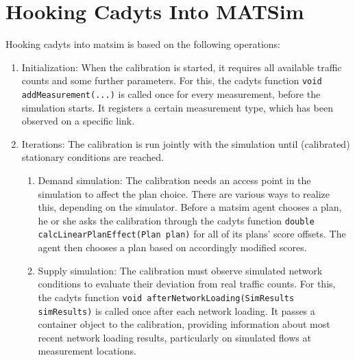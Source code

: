 \section{Hooking Cadyts Into MATSim}
Hooking \gls{cadyts} into \gls{matsim} is based on the following operations:
\begin{enumerate}\styleEnumerate
\item Initialization: When the calibration is started, it requires all available 
traffic counts and some further parameters. 
For this, the \gls{cadyts} function \lstinline|void addMeasurement(...)| is called once for every 
measurement, before the simulation starts. It registers a certain measurement type, which 
has been observed on a specific link.
\item Iterations: The calibration is run jointly with the simulation until (calibrated) 
stationary conditions are reached.
	\begin{enumerate}[label=\emph{\alph*})]
	\item Demand simulation: The calibration needs an access point in the simulation 
	to affect the plan choice. There are various ways to realize this, depending on the  
	simulator.	
	Before a \gls{matsim} agent chooses a plan, he or she asks the calibration through the 
	\gls{cadyts} function
	\lstinline|double calcLinearPlanEffect(Plan plan)| for all of its plans' score offsets.
    The agent then chooses a plan based on accordingly modified scores.
	\item Supply simulation: The calibration must observe simulated network conditions 
  to evaluate their deviation from real traffic counts.
	For this, the \gls{cadyts} function \lstinline|void afterNetworkLoading(SimResults simResults)| 
	is called once after each network loading. It passes a container object to the calibration, 
	providing information about most recent network loading results, particularly on 
	simulated flows at measurement locations.
	\end{enumerate}
\end{enumerate}

